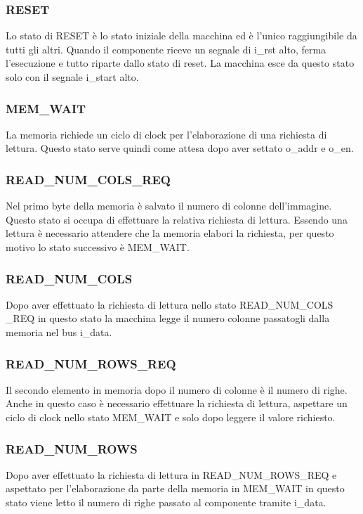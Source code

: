\documentclass{article}
\begin{document}
\subsubsection{RESET}
Lo stato di RESET è lo stato iniziale della macchina ed è l'unico raggiungibile da tutti gli altri. Quando il componente riceve un segnale di i\_rst alto, ferma l'esecuzione e tutto riparte dallo stato di reset. La macchina esce da questo stato solo con il segnale i\_start alto.

\subsubsection{MEM\_WAIT}
La memoria richiede un ciclo di clock per l'elaborazione di una richiesta di lettura. Questo stato serve quindi come attesa dopo aver settato o\_addr e o\_en.

\subsubsection{READ\_NUM\_COLS\_REQ}
Nel primo byte della memoria è salvato il numero di colonne dell'immagine. Questo stato si occupa di effettuare la relativa richiesta di lettura. Essendo una lettura è necessario attendere che la memoria elabori la richiesta, per questo motivo lo stato successivo è MEM\_WAIT.

\subsubsection{READ\_NUM\_COLS}
Dopo aver effettuato la richiesta di lettura nello stato READ\_NUM\_COLS\\\_REQ in questo stato la macchina legge il numero colonne passatogli dalla memoria nel bus i\_data.

\subsubsection{READ\_NUM\_ROWS\_REQ}
Il secondo elemento in memoria dopo il numero di colonne è il numero di righe. Anche in questo caso è necessario effettuare la richiesta di lettura, aspettare un ciclo di clock nello stato MEM\_WAIT e solo dopo leggere il valore richiesto.

\subsubsection{READ\_NUM\_ROWS}
Dopo aver effettuato la richiesta di lettura in READ\_NUM\_ROWS\_REQ e aspettato per l'elaborazione da parte della memoria in MEM\_WAIT in questo stato viene letto il numero di righe passato al componente tramite i\_data.
\end{document}
